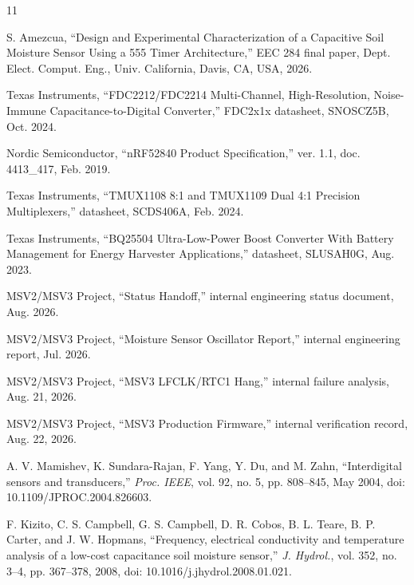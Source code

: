 \documentclass[conference]{IEEEtran}
\begin{document}
\begin{thebibliography}{11}

S. Amezcua, ``Design and Experimental Characterization of a Capacitive Soil Moisture Sensor Using a
555 Timer Architecture,'' EEC 284 final paper, Dept. Elect. Comput. Eng., Univ. California, Davis,
CA, USA, 2026.

Texas Instruments, ``FDC2212/FDC2214 Multi-Channel, High-Resolution, Noise-Immune
Capacitance-to-Digital Converter,'' FDC2x1x datasheet, SNOSCZ5B, Oct. 2024.

Nordic Semiconductor, ``nRF52840 Product Specification,'' ver. 1.1, doc. 4413\_417, Feb. 2019.

Texas Instruments, ``TMUX1108 8:1 and TMUX1109 Dual 4:1 Precision Multiplexers,'' datasheet,
SCDS406A, Feb. 2024.

Texas Instruments, ``BQ25504 Ultra-Low-Power Boost Converter With Battery Management for Energy
Harvester Applications,'' datasheet, SLUSAH0G, Aug. 2023.

MSV2/MSV3 Project, ``Status Handoff,'' internal engineering status document, Aug. 2026.

MSV2/MSV3 Project, ``Moisture Sensor Oscillator Report,'' internal engineering report, Jul. 2026.

MSV2/MSV3 Project, ``MSV3 LFCLK/RTC1 Hang,'' internal failure analysis, Aug. 21, 2026.

MSV2/MSV3 Project, ``MSV3 Production Firmware,'' internal verification record, Aug. 22, 2026.

A. V. Mamishev, K. Sundara-Rajan, F. Yang, Y. Du, and M. Zahn, ``Interdigital sensors and
transducers,'' \emph{Proc. IEEE}, vol. 92, no. 5, pp. 808--845, May 2004,
doi: 10.1109/JPROC.2004.826603.

F. Kizito, C. S. Campbell, G. S. Campbell, D. R. Cobos, B. L. Teare, B. P. Carter, and
J. W. Hopmans, ``Frequency, electrical conductivity and temperature analysis of a low-cost
capacitance soil moisture sensor,'' \emph{J. Hydrol.}, vol. 352, no. 3--4, pp. 367--378, 2008,
doi: 10.1016/j.jhydrol.2008.01.021.

\end{thebibliography}
\end{document}

